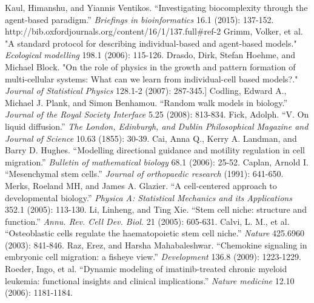 \documentclass[12pt]{article}
\begin{document}
\begin{thebibliography}{99}
  Kaul, Himanshu, and Yiannis Ventikos. ``Investigating biocomplexity through the agent-based paradigm.'' {\itshape Briefings in bioinformatics} 16.1 (2015): 137-152. http://bib.oxfordjournals.org/content/16/1/137.full\#ref-2
 Grimm, Volker, et al. "A standard protocol for describing individual-based and agent-based models." {\itshape Ecological modelling} 198.1 (2006): 115-126.
 Drasdo, Dirk, Stefan Hoehme, and Michael Block. "On the role of physics in the growth and pattern formation of multi-cellular systems: What can we learn from individual-cell based models?." {\itshape Journal of Statistical Physics} 128.1-2 (2007): 287-345.]
  Codling, Edward A., Michael J. Plank, and Simon Benhamou. ``Random walk models in biology.'' {\itshape Journal of the Royal Society Interface} 5.25 (2008): 813-834.
  Fick, Adolph. ``V. On liquid diffusion.'' {\itshape The London, Edinburgh, and Dublin Philosophical Magazine and Journal of Science} 10.63 (1855): 30-39.
  Cai, Anna Q., Kerry A. Landman, and Barry D. Hughes. ``Modelling directional guidance and motility regulation in cell migration.'' {\itshape Bulletin of mathematical biology} 68.1 (2006): 25-52.
  Caplan, Arnold I. ``Mesenchymal stem cells.'' {\itshape Journal of orthopaedic research} (1991): 641-650.
  Merks, Roeland MH, and James A. Glazier. ``A cell-centered approach to developmental biology.'' {\itshape Physica A: Statistical Mechanics and its Applications} 352.1 (2005): 113-130.
  Li, Linheng, and Ting Xie. ``Stem cell niche: structure and function.'' {\itshape Annu. Rev. Cell Dev. Biol.} 21 (2005): 605-631.
  Calvi, L. M., et al. ``Osteoblastic cells regulate the haematopoietic stem cell niche.'' {\itshape Nature} 425.6960 (2003): 841-846.
  Raz, Erez, and Harsha Mahabaleshwar. ``Chemokine signaling in embryonic cell migration: a fisheye view.'' {\itshape Development} 136.8 (2009): 1223-1229.
  Roeder, Ingo, et al. ``Dynamic modeling of imatinib-treated chronic myeloid leukemia: functional insights and clinical implications.'' {\itshape Nature medicine} 12.10 (2006): 1181-1184.
\end{thebibliography}

 
\end{document}

